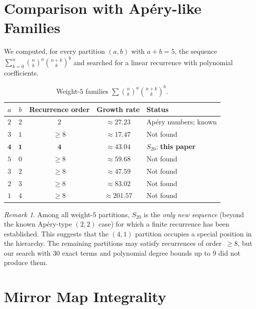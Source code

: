 \documentclass[12pt,reqno]{amsart}
\theoremstyle{plain}
\theoremstyle{definition}
\theoremstyle{remark}
\newtheorem{remark}[theorem]{Remark}
\begin{document}
\section{Comparison with Ap\'ery-like Families}\label{sec:families}

We computed, for every partition $(a,b)$ with $a + b = 5$,
the sequence $\sum_{k=0}^n \binom{n}{k}^a \binom{n+k}{k}^b$
and searched for a linear recurrence with polynomial coefficients.

\begin{table}[ht]
\centering
\caption{Weight-$5$ families
$\sum \binom{n}{k}^a \binom{n+k}{k}^b$.}
\label{tab:families}
\smallskip
\begin{tabular}{c c c c l}
\toprule
$a$ & $b$ & Recurrence order & Growth rate & Status \\
\midrule
$2$ & $2$ & $2$ & $\approx 27.23$ & Ap\'ery numbers; known \\
$3$ & $1$ & $\ge 8$ & $\approx 17.47$ & Not found \\
$\mathbf{4}$ & $\mathbf{1}$ & $\mathbf{4}$ & $\boldsymbol{\approx 43.04}$ & $S_{20}$; \textbf{this paper} \\
$5$ & $0$ & $\ge 8$ & $\approx 59.68$ & Not found \\
$3$ & $2$ & $\ge 8$ & $\approx 47.59$ & Not found \\
$2$ & $3$ & $\ge 8$ & $\approx 83.02$ & Not found \\
$1$ & $4$ & $\ge 8$ & $\approx 201.57$ & Not found \\
\bottomrule
\end{tabular}
\end{table}

\begin{remark}
Among all weight-$5$ partitions, $S_{20}$ is the
\emph{only new sequence} (beyond the known Ap\'ery-type $(2,2)$
case) for which a finite recurrence has been established.
This suggests that the $(4,1)$ partition occupies a special
position in the hierarchy.
The remaining partitions may satisfy recurrences of order~$\ge 8$,
but our search with $30$ exact terms and polynomial degree
bounds up to $9$ did not produce them.
\end{remark}


\section{Mirror Map Integrality}\label{sec:mirror}
\end{document}
